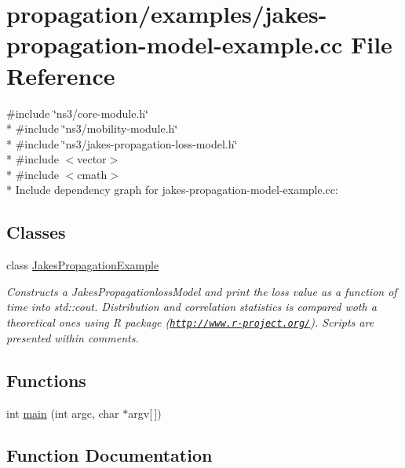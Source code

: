 \hypertarget{jakes-propagation-model-example_8cc}{}\section{propagation/examples/jakes-\/propagation-\/model-\/example.cc File Reference}
\label{jakes-propagation-model-example_8cc}
{\ttfamily \#include \char`\"{}ns3/core-\/module.\+h\char`\"{}}\\*
{\ttfamily \#include \char`\"{}ns3/mobility-\/module.\+h\char`\"{}}\\*
{\ttfamily \#include \char`\"{}ns3/jakes-\/propagation-\/loss-\/model.\+h\char`\"{}}\\*
{\ttfamily \#include $<$vector$>$}\\*
{\ttfamily \#include $<$cmath$>$}\\*
Include dependency graph for jakes-\/propagation-\/model-\/example.cc\+:
\subsection*{Classes}
\begin{DoxyCompactItemize}
\item 
class \hyperlink{classJakesPropagationExample}{Jakes\+Propagation\+Example}
\begin{DoxyCompactList}\small\item\em Constructs a Jakes\+Propagationloss\+Model and print the loss value as a function of time into std\+::cout. Distribution and correlation statistics is compared woth a theoretical ones using R package (\href{http://www.r-project.org/}{\tt http\+://www.\+r-\/project.\+org/}). Scripts are presented within comments. \end{DoxyCompactList}\end{DoxyCompactItemize}
\subsection*{Functions}
\begin{DoxyCompactItemize}
\item 
int \hyperlink{jakes-propagation-model-example_8cc_a0ddf1224851353fc92bfbff6f499fa97}{main} (int argc, char $\ast$argv\mbox{[}$\,$\mbox{]})
\end{DoxyCompactItemize}


\subsection{Function Documentation}
